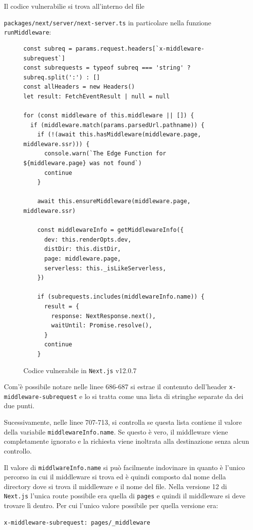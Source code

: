 \documentclass[a4paper,oneside,12pt]{report}
\begin{document}
Il codice vulnerabilie si trova all'interno del file \raggedright\texttt{packages/next/server/next-server.ts} in particolare nella funzione \texttt{runMiddleware}:
\begin{figure}[H]
	\centering
\begin{verbatim}
const subreq = params.request.headers[`x-middleware-subrequest`]
const subrequests = typeof subreq === 'string' ? subreq.split(':') : []
const allHeaders = new Headers()
let result: FetchEventResult | null = null

for (const middleware of this.middleware || []) {
  if (middleware.match(params.parsedUrl.pathname)) {
    if (!(await this.hasMiddleware(middleware.page, middleware.ssr))) {
      console.warn(`The Edge Function for ${middleware.page} was not found`)
      continue
    }

    await this.ensureMiddleware(middleware.page, middleware.ssr)

    const middlewareInfo = getMiddlewareInfo({
      dev: this.renderOpts.dev,
      distDir: this.distDir,
      page: middleware.page,
      serverless: this._isLikeServerless,
    })

    if (subrequests.includes(middlewareInfo.name)) {
      result = {
        response: NextResponse.next(),
        waitUntil: Promise.resolve(),
      }
      continue
    }
\end{verbatim}
	\caption{Codice vulnerabile in \texttt{Next.js} v12.0.7}
	\label{fig:nextjs-vulnerable-code-v12.0.7}
\end{figure}

Com'\`e possibile notare nelle linee 686-687 si estrae il contenuto dell'header \texttt{x-middleware-subrequest} e lo si tratta come una lista di stringhe separate da dei due punti.

Sucessivamente, nelle linee 707-713, si controlla se questa lista contiene il valore della variabile \texttt{middlewareInfo.name}. Se questo \`e vero, il middleware viene completamente ignorato e la richiesta viene inoltrata alla destinazione senza alcun controllo.

Il valore di \texttt{middlwareInfo.name} si pu\`o facilmente indovinare in quanto \`e l'unico percorso in cui il middleware si trova ed \`e quindi composto dal nome della directory dove si trova il middleware e il nome del file. Nella versione 12 di \texttt{Next.js} l'unica route possibile era quella di \texttt{pages} e quindi il middleware si deve trovare l\`i dentro. Per cui l'unico valore possibile per quella versione era:
\begin{center}
	\scriptsize
	\texttt{x-middleware-subrequest: pages/\_middleware}
\end{center}
\end{document}
